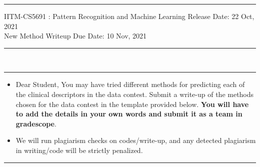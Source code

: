 \documentclass[solution,addpoints,12pt]{exam}
\begin{document}
\hrule
\vspace{3mm}
\noindent 
{\sf IITM-CS5691 : Pattern Recognition and Machine Learning  \hfill Release Date: 22 Oct, 2021}
\\
\noindent 
{\sf New Method Writeup \hfill Due Date: 10 Nov, 2021}
\vspace{3mm}
\hrule
\vspace{3mm}
\\
\hrule
{\small
\begin{itemize}
\item Dear Student, You may have tried different methods for predicting each of the clinical descriptors in the data contest. Submit a write-up of the methods chosen for the data contest in the template provided below.  {\bf You will have to add the details  in your own words and submit it as a team in gradescope}.
\item We will run plagiarism checks on codes/write-up, and any detected plagiarism in writing/code will be strictly penalized. 
\end{itemize}
}
\hrule
\end{document}
